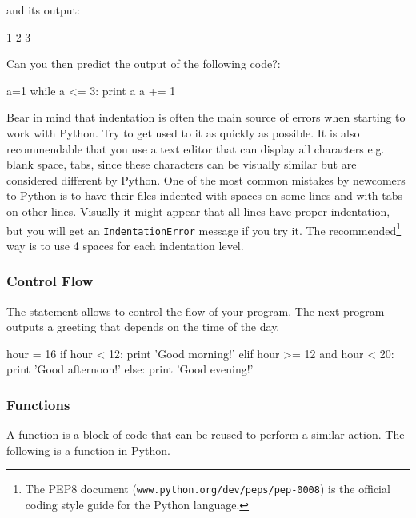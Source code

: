 \noindent and its output:

\begin{python}
1
2
3
\end{python}


\begin{exercise}
Can you then predict the output of the following code?:

\begin{python}
a=1
while a <= 3:
    print a
a += 1
\end{python}

\end{exercise}

\noindent Bear in mind that indentation is often the main source of errors when starting to work with Python. Try to get used to it as quickly as possible. It is also recommendable that you use a text editor that can display all characters e.g. blank space, tabs, since these characters can be visually similar but are considered different by Python. One of the most common mistakes by newcomers to Python is to have their files indented with spaces on some lines and with tabs on other lines. Visually it might appear that all lines have proper indentation, but you will get an \texttt{IndentationError} message if you try it. The recommended\footnote{The PEP8 document (\texttt{www.python.org/dev/peps/pep-0008}) is the official coding style guide for the Python language.} way is to use 4 spaces for each indentation level.

\subsubsection{Control Flow}

The  statement allows to control the flow of your program. The next program outputs a greeting that depends on the time of the day.

\begin{python}
hour = 16
if hour < 12:
    print 'Good morning!'
elif hour >= 12 and hour < 20:
    print 'Good afternoon!'
else:
    print 'Good evening!'
\end{python}

\subsubsection{Functions}

A function is a block of code that can be reused to perform a similar action.
The following is a function in Python. 

